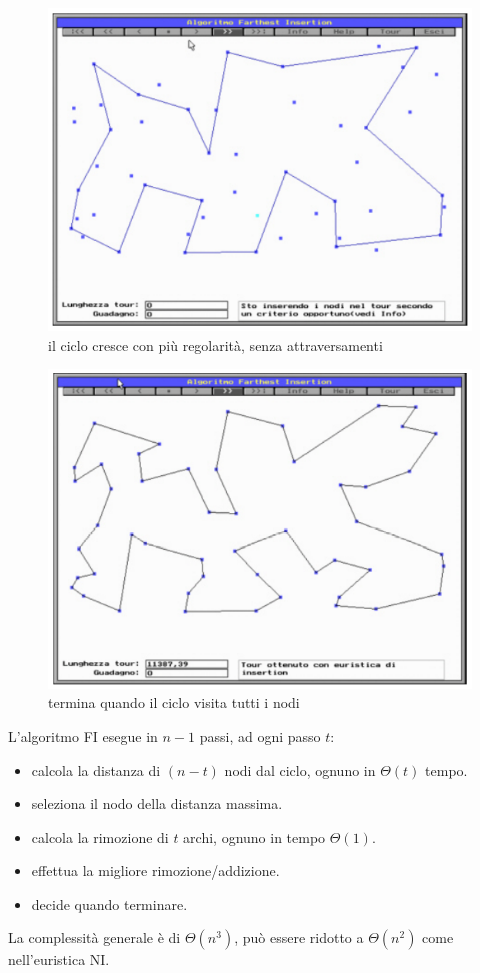 \documentclass{article}
\begin{document}
    \begin{figure}[H]
        \centering
        \includegraphics[scale=0.5]{images/farthest3.png}
        \caption{il ciclo cresce con più regolarità, senza attraversamenti}
    \end{figure}

    \begin{figure}[H]
        \centering
        \includegraphics[scale=0.5]{images/farthest4.png}
        \caption{termina quando il ciclo visita tutti i nodi}
    \end{figure}

    L'algoritmo FI esegue in $n-1$ passi, ad ogni passo $t$:
    \begin{itemize}
        \item calcola la distanza di $(n-t)$ nodi dal ciclo, ognuno in $\Theta(t)$ tempo.
        \item seleziona il nodo della distanza massima.
        \item calcola la rimozione di $t$ archi, ognuno in tempo $\Theta(1)$.
        \item effettua la migliore rimozione/addizione.
        \item decide quando terminare.
    \end{itemize}
    La complessità generale è di $\Theta(n^3)$, può essere ridotto a $\Theta(n^2)$ come nell'euristica NI.
\end{document}
